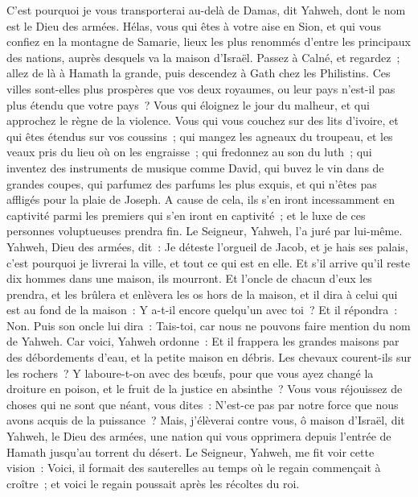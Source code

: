 \begin{multicols}{2}
C'est pourquoi je vous transporterai au-delà de Damas, dit Yahweh, dont le nom est le Dieu des armées.
\VerseOne{}Hélas, vous qui êtes à votre aise en Sion, et qui vous confiez en la montagne de Samarie, lieux les plus renommés d'entre les principaux des nations, auprès desquels va la maison d'Israël.
Passez à Calné, et regardez~; allez de là à Hamath la grande, puis descendez à Gath chez les Philistins. Ces villes sont-elles plus prospères que vos deux royaumes, ou leur pays n'est-il pas plus étendu que votre pays~?
Vous qui éloignez le jour du malheur, et qui approchez le règne de la violence.
Vous qui vous couchez sur des lits d'ivoire, et qui êtes étendus sur vos coussins~; qui mangez les agneaux du troupeau, et les veaux pris du lieu où on les engraisse~;
qui fredonnez au son du luth~; qui inventez des instruments de musique comme David,
qui buvez le vin dans de grandes coupes, qui parfumez des parfums les plus exquis, et qui n'êtes pas affligés pour la plaie de Joseph.
A cause de cela, ils s'en iront incessamment en captivité parmi les premiers qui s'en iront en captivité~; et le luxe de ces personnes voluptueuses prendra fin. 
Le Seigneur, Yahweh, l'a juré par lui-même. Yahweh, Dieu des armées, dit~: Je déteste l'orgueil de Jacob, et je hais ses palais, c'est pourquoi je livrerai la ville, et tout ce qui est en elle.
Et s'il arrive qu'il reste dix hommes dans une maison, ils mourront.
Et l'oncle de chacun d'eux les prendra, et les brûlera et enlèvera les os hors de la maison, et il dira à celui qui est au fond de la maison~: Y a-t-il encore quelqu'un avec toi~? Et il répondra~: Non. Puis son oncle lui dira~: Tais-toi, car nous ne pouvons faire mention du nom de Yahweh.
Car voici, Yahweh ordonne~: Et il frappera les grandes maisons par des débordements d'eau, et la petite maison en débris.
Les chevaux courent-ils sur les rochers~? Y laboure-t-on avec des bœufs, pour que vous ayez changé la droiture en poison, et le fruit de la justice en absinthe~?
Vous vous réjouissez de choses qui ne sont que néant, vous dites~: N'est-ce pas par notre force que nous avons acquis de la puissance~?
Mais, j'élèverai contre vous, ô maison d'Israël, dit Yahweh, le Dieu des armées, une nation qui vous opprimera depuis l'entrée de Hamath jusqu'au torrent du désert.
\VerseOne{}Le Seigneur, Yahweh, me fit voir cette vision~: Voici, il formait des sauterelles au temps où le regain commençait à croître~; et voici le regain poussait après les récoltes du roi.

\end{multicols}
